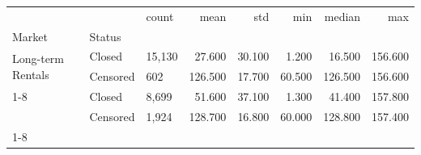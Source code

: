 \begin{tabular}{lllrrrrr}
\toprule
 &  & count & mean & std & min & median & max \\
Market & Status &  &  &  &  &  &  \\
\midrule
\multirow[t]{2}{*}{Long-term Rentals} & Closed & 15,130 & 27.600 & 30.100 & 1.200 & 16.500 & 156.600 \\
 & Censored & 602 & 126.500 & 17.700 & 60.500 & 126.500 & 156.600 \\
\cline{1-8}
\multirow[t]{2}{*}{Secondary Sales} & Closed & 8,699 & 51.600 & 37.100 & 1.300 & 41.400 & 157.800 \\
 & Censored & 1,924 & 128.700 & 16.800 & 60.000 & 128.800 & 157.400 \\
\cline{1-8}
\bottomrule
\end{tabular}
